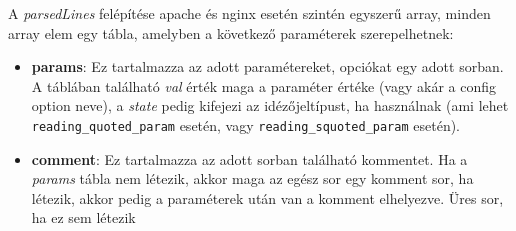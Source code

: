 A \textit{parsedLines} felépítése apache és nginx esetén szintén egyszerű array, minden array elem egy tábla, amelyben a következő paraméterek szerepelhetnek:

\begin{itemize}
	\item \textbf{params}: Ez tartalmazza az adott paramétereket, opciókat egy adott sorban. A táblában található \textit{val} érték maga a paraméter értéke (vagy akár a config option neve), a \textit{state} pedig kifejezi az idézőjeltípust, ha használnak (ami lehet \texttt{reading\_quoted\_param}  esetén, vagy \texttt{reading\_squoted\_param}  esetén).	
	\item \textbf{comment}: Ez tartalmazza az adott sorban található kommentet. Ha a \textit{params} tábla nem létezik, akkor maga az egész sor egy komment sor, ha létezik, akkor pedig a paraméterek után van a komment elhelyezve. Üres sor, ha ez sem létezik
\end{itemize}


